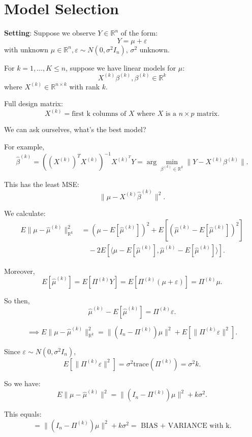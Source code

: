 \documentclass[open=any, 11pt,paper=A4]{scrreprt}
\begin{document}
\section{Model Selection}

\textbf{Setting}: Suppose we observe \(Y\in \mathbb{R}^n\) of the form:
\[
Y= \mu +\varepsilon
\]
with unknown \(\mu \in \mathbb{R}^n, \varepsilon \sim N(0, \sigma^2 I_n)\), \(\sigma^2\) unknown.

For \(k =1, \hdots, K \le n\), suppose we have linear models for \(\mu\):
\[
X^{(k)} \beta^{(k)}, \beta^{(k)}\in \mathbb{R}^k
\]
where \(X^{(k)}\in \mathbb{R}^{n \times k}\) with rank \(k\).

\begin{example}
    Full design matrix:
    \[
    X^{(k)}=\text{first k columns of }X \text{ where }X \text{ is a } n\times p \text{ matrix.}
    \]
\end{example}

We can ask ourselves, what's the best model?

For example,
\[
\hat{\beta}^{(k)} = ((X^{(k)})^T X^{(k)})^{-1} X^{(k)^T}Y = \arg \min_{\beta^{(k)}\in \mathbb{R}^k} \| Y- X^{(k)} \beta^{(k)}\|.
\]

This has the least MSE:
\[
\| \mu - X^{(k)} \hat{\beta}^{(k)}\|^2.
\]

We calculate:
\begin{align*}
    E\| \mu - \hat{\mu}^{(k)}\|^2_{\mathbb{R}^k}&= (\mu - E[\hat{\mu}^{(k)}])^2 +E[(\hat{\mu}^{(k)}- E[\hat{\mu}^{(k)}])^2]\\
    &\quad - 2 E[\langle \mu - E[\hat{\mu}^{(k)}], \hat{\mu}^{(k)} - E[\hat{\mu}^{(k)}]\rangle].
\end{align*}

Moreover,
\[
E[\hat{\mu}^{(k)}] = E[\Pi^{(k)}Y] = E[\Pi^{(k)} (\mu +\varepsilon)] = \Pi^{(k)}\mu.
\]

So then,
\[
\hat{\mu}^{(k)}- E[\hat{\mu}^{(k)}]= \Pi^{(k)} \varepsilon.
\]

\[
\implies E\| \mu - \hat{\mu}^{(k)}\|^2_{\mathbb{R}^k} = \|(I_n-\Pi^{(k)}) \mu \|^2 + E[\|\Pi^{(k)} \varepsilon\|^2].
\]

Since \(\varepsilon \sim N(0,\sigma^2 I_n)\),
\[
E[\|\Pi^{(k)}\varepsilon\|^2] = \sigma^2 \mathrm{trace}(\Pi^{(k)}) = \sigma^2 k.
\]

So we have:
\[
E\| \mu - \hat{\mu}^{(k)}\|^2 = \| (I_n - \Pi^{(k)})\mu \|^2 + k\sigma^2.
\]

This equals:
\[
= \| (I_n - \Pi^{(k)})\mu \|^2 +k\sigma^2 = \text{ BIAS + VARIANCE with k}.
\]
\end{document}
